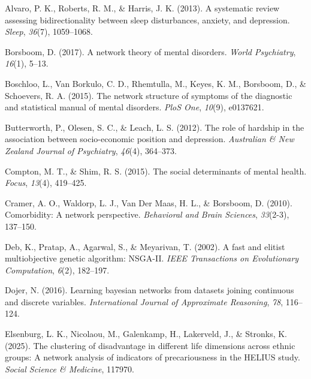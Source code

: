 \documentclass[
]{article}
\newlength{\cslhangindent}
\newenvironment{CSLReferences}[2] %
 {\begin{list}{}{%
  \setlength{\itemindent}{0pt}
  \setlength{\leftmargin}{0pt}
  \setlength{\parsep}{0pt}
  \ifodd #1
   \setlength{\leftmargin}{\cslhangindent}
   \setlength{\itemindent}{-1\cslhangindent}
  \fi
  \setlength{\itemsep}{#2\baselineskip}}}
 {\end{list}}
\begin{document}
\label{refs}
\begin{CSLReferences}{1}{0}
Alvaro, P. K., Roberts, R. M., \& Harris, J. K. (2013). A systematic
review assessing bidirectionality between sleep disturbances, anxiety,
and depression. \emph{Sleep}, \emph{36}(7), 1059--1068.

Borsboom, D. (2017). A network theory of mental disorders. \emph{World
Psychiatry}, \emph{16}(1), 5--13.

Boschloo, L., Van Borkulo, C. D., Rhemtulla, M., Keyes, K. M., Borsboom,
D., \& Schoevers, R. A. (2015). The network structure of symptoms of the
diagnostic and statistical manual of mental disorders. \emph{PloS One},
\emph{10}(9), e0137621.

Butterworth, P., Olesen, S. C., \& Leach, L. S. (2012). The role of
hardship in the association between socio-economic position and
depression. \emph{Australian \& New Zealand Journal of Psychiatry},
\emph{46}(4), 364--373.

Compton, M. T., \& Shim, R. S. (2015). The social determinants of mental
health. \emph{Focus}, \emph{13}(4), 419--425.

Cramer, A. O., Waldorp, L. J., Van Der Maas, H. L., \& Borsboom, D.
(2010). Comorbidity: A network perspective. \emph{Behavioral and Brain
Sciences}, \emph{33}(2-3), 137--150.

Deb, K., Pratap, A., Agarwal, S., \& Meyarivan, T. (2002). A fast and
elitist multiobjective genetic algorithm: NSGA-II. \emph{IEEE
Transactions on Evolutionary Computation}, \emph{6}(2), 182--197.

Dojer, N. (2016). Learning bayesian networks from datasets joining
continuous and discrete variables. \emph{International Journal of
Approximate Reasoning}, \emph{78}, 116--124.

Elsenburg, L. K., Nicolaou, M., Galenkamp, H., Lakerveld, J., \&
Stronks, K. (2025). The clustering of disadvantage in different life
dimensions across ethnic groups: A network analysis of indicators of
precariousness in the HELIUS study. \emph{Social Science \& Medicine},
117970.


\end{CSLReferences}
\end{document}

